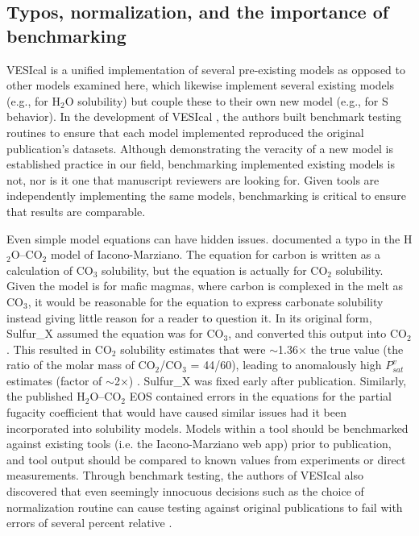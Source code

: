 \documentclass[draft, english]{volcanica-template}
\begin{document}
\subsection{Typos, normalization, and the importance of benchmarking}
VESIcal is a unified implementation of several pre-existing models as opposed to other models examined here, which likewise implement several existing models (e.g., for H$_2$O solubility) but couple these to their own new model (e.g., for S behavior). In the development of VESIcal \parencite{Iacovino2021, WieserVESIcal2022}, the authors built benchmark testing routines to ensure that each model implemented reproduced the original publication's datasets. Although demonstrating the veracity of a new model is established practice in our field, benchmarking implemented existing models is not, nor is it one that manuscript reviewers are looking for. Given tools are independently implementing the same models, benchmarking is critical to ensure that results are comparable.

Even simple model equations can have hidden issues. \textcite{Iacovino2021} documented a typo in the H$_2$O–CO$_2$ model of Iacono-Marziano. The equation for carbon is written as a calculation of CO$_3$ solubility, but the equation is actually for CO$_2$ solubility. Given the model is for mafic magmas, where carbon is complexed in the melt as CO$_3$, it would be reasonable for the equation to express carbonate solubility instead giving little reason for a reader to question it. In its original form, Sulfur\_X assumed the equation was for CO$_3$, and converted this output into CO$_2$. This resulted in CO$_2$ solubility estimates that were $\sim$1.36× the true value (the ratio of the molar mass of CO$_2$/CO$_3$ = 44/60), leading to anomalously high $P^v_{sat}$ estimates (factor of $\sim$2×) . Sulfur\_X was fixed early after publication. Similarly, the published \textcite{duan2006equation} H$_2$O–CO$_2$ EOS contained errors in the equations for the partial fugacity coefficient \parencite{yoshimura2023carbon} that would have caused similar issues had it been incorporated into solubility models. Models within a tool should be benchmarked against existing tools (i.e. the Iacono-Marziano web app) prior to publication, and tool output should be compared to known values from experiments or direct measurements. Through benchmark testing, the authors of VESIcal also discovered that even seemingly innocuous decisions such as the choice of normalization routine can cause testing against original publications to fail with errors of several percent relative \parencite{Iacovino2021}.
\end{document}
